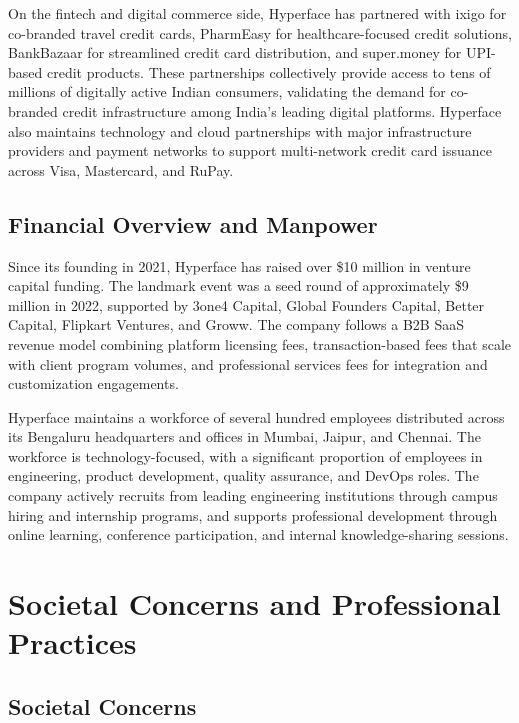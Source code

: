 On the fintech and digital commerce side, Hyperface has partnered with ixigo for co-branded travel credit cards, PharmEasy for healthcare-focused credit solutions, BankBazaar for streamlined credit card distribution, and super.money for UPI-based credit products. These partnerships collectively provide access to tens of millions of digitally active Indian consumers, validating the demand for co-branded credit infrastructure among India's leading digital platforms. Hyperface also maintains technology and cloud partnerships with major infrastructure providers and payment networks to support multi-network credit card issuance across Visa, Mastercard, and RuPay.

\subsection{Financial Overview and Manpower}

Since its founding in 2021, Hyperface has raised over \$10 million in venture capital funding. The landmark event was a seed round of approximately \$9 million in 2022, supported by 3one4 Capital, Global Founders Capital, Better Capital, Flipkart Ventures, and Groww. The company follows a B2B SaaS revenue model combining platform licensing fees, transaction-based fees that scale with client program volumes, and professional services fees for integration and customization engagements.

Hyperface maintains a workforce of several hundred employees distributed across its Bengaluru headquarters and offices in Mumbai, Jaipur, and Chennai. The workforce is technology-focused, with a significant proportion of employees in engineering, product development, quality assurance, and DevOps roles. The company actively recruits from leading engineering institutions through campus hiring and internship programs, and supports professional development through online learning, conference participation, and internal knowledge-sharing sessions.

\section{Societal Concerns and Professional Practices}

\subsection{Societal Concerns}

